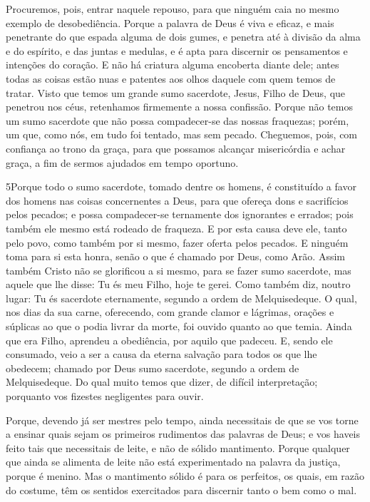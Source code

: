 Procuremos, pois, entrar naquele repouso, para que ninguém caia
no mesmo exemplo de desobediência. Porque a palavra de Deus é
viva e eficaz, e mais penetrante do que espada alguma de dois gumes,
e penetra até à divisão da alma e do espírito, e das juntas e
medulas, e é apta para discernir os pensamentos e intenções do
coração. E não há criatura alguma encoberta diante dele;
antes todas as coisas estão nuas e patentes aos olhos daquele com
quem temos de tratar. Visto que temos um grande sumo
sacerdote, Jesus, Filho de Deus, que penetrou nos céus, retenhamos
firmemente a nossa confissão. Porque não temos um sumo
sacerdote que não possa compadecer-se das nossas fraquezas; porém,
um que, como nós, em tudo foi tentado, mas sem pecado.
Cheguemos, pois, com confiança ao trono da graça, para que
possamos alcançar misericórdia e achar graça, a fim de sermos
ajudados em tempo oportuno.

\medskip

\lettrine{5} Porque todo o sumo sacerdote, tomado dentre os
homens, é constituído a favor dos homens nas coisas concernentes a
Deus, para que ofereça dons e sacrifícios pelos pecados; e possa
compadecer-se ternamente dos ignorantes e errados; pois também ele
mesmo está rodeado de fraqueza. E por esta causa deve ele, tanto
pelo povo, como também por si mesmo, fazer oferta pelos pecados.
E ninguém toma para si esta honra, senão o que é chamado por
Deus, como Arão. Assim também Cristo não se glorificou a si
mesmo, para se fazer sumo sacerdote, mas aquele que lhe disse: Tu és
meu Filho, hoje te gerei. Como também diz, noutro lugar: Tu és
sacerdote eternamente, segundo a ordem de Melquisedeque. O qual,
nos dias da sua carne, oferecendo, com grande clamor e lágrimas,
orações e súplicas ao que o podia livrar da morte, foi ouvido quanto
ao que temia. Ainda que era Filho, aprendeu a obediência, por
aquilo que padeceu. E, sendo ele consumado, veio a ser a causa
da eterna salvação para todos os que lhe obedecem; chamado
por Deus sumo sacerdote, segundo a ordem de Melquisedeque. Do
qual muito temos que dizer, de difícil interpretação; porquanto vos
fizestes negligentes para ouvir.

Porque, devendo já ser mestres pelo tempo, ainda necessitais de
que se vos torne a ensinar quais sejam os primeiros rudimentos das
palavras de Deus; e vos haveis feito tais que necessitais de leite,
e não de sólido mantimento. Porque qualquer que ainda se
alimenta de leite não está experimentado na palavra da justiça,
porque é menino. Mas o mantimento sólido é para os perfeitos,
os quais, em razão do costume, têm os sentidos exercitados para
discernir tanto o bem como o mal.


